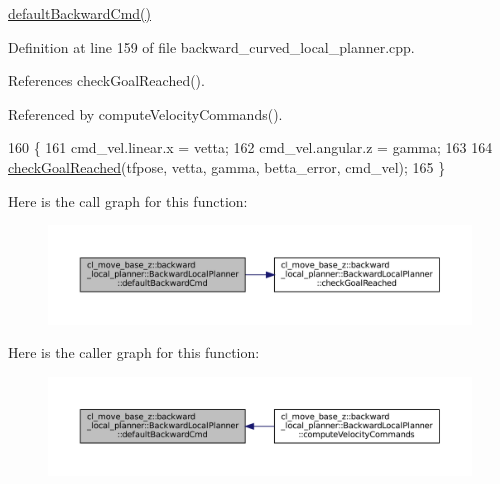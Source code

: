 \hyperlink{classcl__move__base__z_1_1backward__local__planner_1_1BackwardLocalPlanner_a1ebd69a028a22e3573e98f89d593f97d}{default\+Backward\+Cmd()} 

Definition at line 159 of file backward\+\_\+curved\+\_\+local\+\_\+planner.\+cpp.



References check\+Goal\+Reached().



Referenced by compute\+Velocity\+Commands().


\begin{DoxyCode}
160     \{
161         cmd\_vel.linear.x = vetta;
162         cmd\_vel.angular.z = gamma;
163 
164         \hyperlink{classcl__move__base__z_1_1backward__local__planner_1_1BackwardLocalPlanner_a6c4363e82119a6a8a5a3bfe309280898}{checkGoalReached}(tfpose, vetta, gamma, betta\_error, cmd\_vel);
165     \}
\end{DoxyCode}
Here is the call graph for this function\+:
\nopagebreak
\begin{figure}[H]
\begin{center}
\leavevmode
\includegraphics[width=350pt]{classcl__move__base__z_1_1backward__local__planner_1_1BackwardLocalPlanner_a1ebd69a028a22e3573e98f89d593f97d_cgraph}
\end{center}
\end{figure}
Here is the caller graph for this function\+:
\nopagebreak
\begin{figure}[H]
\begin{center}
\leavevmode
\includegraphics[width=350pt]{classcl__move__base__z_1_1backward__local__planner_1_1BackwardLocalPlanner_a1ebd69a028a22e3573e98f89d593f97d_icgraph}
\end{center}
\end{figure}
\mbox{\label{classcl__move__base__z_1_1backward__local__planner_1_1BackwardLocalPlanner_a9e8921ca8ce379ca8ba321f82ca23cdc}} 
